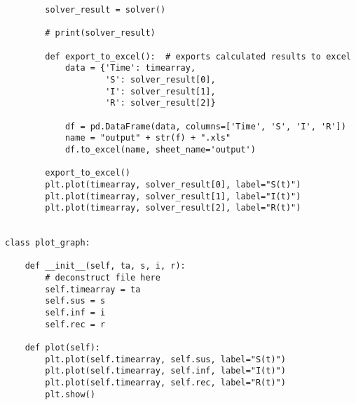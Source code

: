 \documentclass[11pt, a4paper]{article}
\begin{document}
\begin{lstlisting}
        solver_result = solver()

        # print(solver_result)

        def export_to_excel():  # exports calculated results to excel
            data = {'Time': timearray,
                    'S': solver_result[0],
                    'I': solver_result[1],
                    'R': solver_result[2]}

            df = pd.DataFrame(data, columns=['Time', 'S', 'I', 'R'])
            name = "output" + str(f) + ".xls"
            df.to_excel(name, sheet_name='output')

        export_to_excel()
        plt.plot(timearray, solver_result[0], label="S(t)")
        plt.plot(timearray, solver_result[1], label="I(t)")
        plt.plot(timearray, solver_result[2], label="R(t)")


class plot_graph:

    def __init__(self, ta, s, i, r):
        # deconstruct file here
        self.timearray = ta
        self.sus = s
        self.inf = i
        self.rec = r

    def plot(self):
        plt.plot(self.timearray, self.sus, label="S(t)")
        plt.plot(self.timearray, self.inf, label="I(t)")
        plt.plot(self.timearray, self.rec, label="R(t)")
        plt.show()
\end{lstlisting}
\newpage
\end{document}
